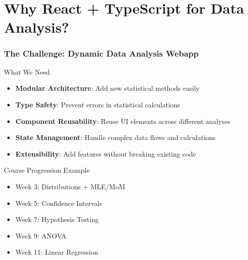 \documentclass[aspectratio=169]{beamer}
\begin{document}
\section{Why React + TypeScript for Data Analysis?}

\begin{frame}
\frametitle{The Challenge: Dynamic Data Analysis Webapp}
\begin{alertblock}{What We Need}
\begin{itemize}
\item \textbf{Modular Architecture}: Add new statistical methods easily
\item \textbf{Type Safety}: Prevent errors in statistical calculations
\item \textbf{Component Reusability}: Reuse UI elements across different analyses
\item \textbf{State Management}: Handle complex data flows and calculations
\item \textbf{Extensibility}: Add features without breaking existing code
\end{itemize}
\end{alertblock}

\begin{exampleblock}{Course Progression Example}
\begin{itemize}
\item Week 3: Distributions + MLE/MoM
\item Week 5: Confidence Intervals
\item Week 7: Hypothesis Testing
\item Week 9: ANOVA
\item Week 11: Linear Regression
\end{itemize}
\end{exampleblock}
\end{frame}
\end{document}
